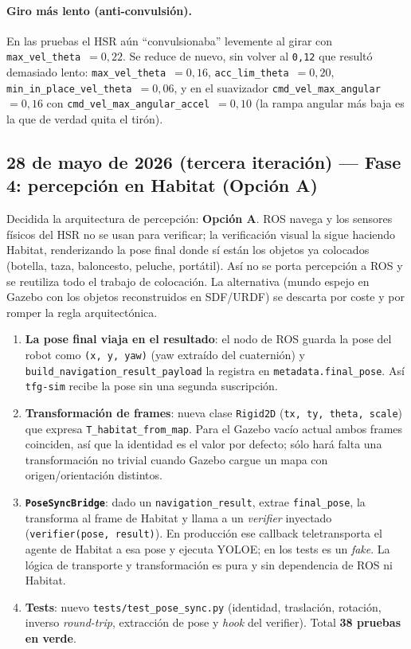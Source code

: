 \documentclass[11pt,a4paper]{article}
\begin{document}
\paragraph{Giro más lento (anti-convulsión).} En las pruebas el HSR aún
``convulsionaba'' levemente al girar con \texttt{max\_vel\_theta}~$=0{,}22$.
Se reduce de nuevo, sin volver al \texttt{0{,}12} que resultó demasiado lento:
\texttt{max\_vel\_theta}~$=0{,}16$, \texttt{acc\_lim\_theta}~$=0{,}20$,
\texttt{min\_in\_place\_vel\_theta}~$=0{,}06$, y en el suavizador
\texttt{cmd\_vel\_max\_angular}~$=0{,}16$ con
\texttt{cmd\_vel\_max\_angular\_accel}~$=0{,}10$ (la rampa angular más baja es
la que de verdad quita el tirón).

\subsection*{28 de mayo de 2026 (tercera iteración) --- Fase 4: percepción en Habitat (Opción A)}

Decidida la arquitectura de percepción: \textbf{Opción A}. ROS navega y los
sensores físicos del HSR no se usan para verificar; la verificación visual la
sigue haciendo Habitat, renderizando la pose final donde sí están los objetos
ya colocados (botella, taza, baloncesto, peluche, portátil). Así no se porta
percepción a ROS y se reutiliza todo el trabajo de colocación. La alternativa
(mundo espejo en Gazebo con los objetos reconstruidos en SDF/URDF) se descarta
por coste y por romper la regla arquitectónica.

\begin{enumerate}
  \item \textbf{La pose final viaja en el resultado}: el nodo de ROS guarda la
        pose del robot como \texttt{(x, y, yaw)} (yaw extraído del cuaternión) y
        \texttt{build\_navigation\_result\_payload} la registra en
        \texttt{metadata.final\_pose}. Así \texttt{tfg-sim} recibe la pose sin
        una segunda suscripción.
  \item \textbf{Transformación de frames}: nueva clase \texttt{Rigid2D}
        (\texttt{tx, ty, theta, scale}) que expresa \texttt{T\_habitat\_from\_map}.
        Para el Gazebo vacío actual ambos frames coinciden, así que la identidad
        es el valor por defecto; sólo hará falta una transformación no trivial
        cuando Gazebo cargue un mapa con origen/orientación distintos.
  \item \textbf{\texttt{PoseSyncBridge}}: dado un \texttt{navigation\_result},
        extrae \texttt{final\_pose}, la transforma al frame de Habitat y llama a
        un \emph{verifier} inyectado (\texttt{verifier(pose, result)}). En
        producción ese callback teletransporta el agente de Habitat a esa pose y
        ejecuta YOLOE; en los tests es un \emph{fake}. La lógica de transporte y
        transformación es pura y sin dependencia de ROS ni Habitat.
  \item \textbf{Tests}: nuevo \texttt{tests/test\_pose\_sync.py} (identidad,
        traslación, rotación, inverso \emph{round-trip}, extracción de pose y
        \emph{hook} del verifier). Total \textbf{38 pruebas en verde}.
\end{enumerate}
\end{document}
